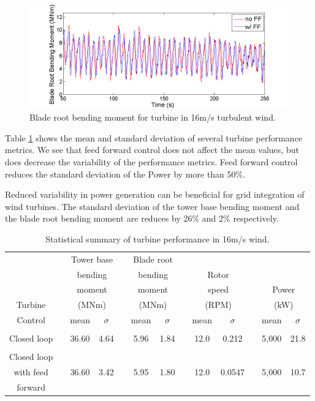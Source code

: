 \begin{figure}[htbp]
	\centering
		\includegraphics[trim = {1cm 0 2cm 0}, clip, width = \linewidth]{Figures/ch3Figures/fig3-23.png}
		
	\caption{Blade root bending moment for turbine in 16m/s turbulent wind.}
	\label{fig3-23}
\end{figure}

Table \ref{Table3-2} shows the mean and standard deviation of several turbine performance metrics. We see that feed forward control does not affect the mean values, but does decrease the variability of the performance metrics. Feed forward control reduces the standard deviation of the Power by more than 50$\%$. 

Reduced variability in power generation can be beneficial for grid integration of wind turbines. The standard deviation of the tower base bending moment and the blade root bending moment are reduces by 26$\%$ and 2$\%$ respectively. 

\begin{table}
\centering
\begin{tabular}{ c | c c c c c c c c c c c c}
\hline
\hline
	& & \multicolumn{2}{c}{Tower base}	& & \multicolumn{2}{c}{Blade root}		& & \\
	& & \multicolumn{2}{c}{bending}	& & \multicolumn{2}{c}{bending}		& &\multicolumn{2}{c}{Rotor}	& & \\
	& & \multicolumn{2}{c}{moment}	& & \multicolumn{2}{c}{moment}		& &\multicolumn{2}{c}{speed}		& &\multicolumn{2}{c}{Power} \\	
Turbine					& & \multicolumn{2}{c}{(MNm)}  					& & \multicolumn{2}{c}{(MNm)}	& & \multicolumn{2}{c}{(RPM)}	& & \multicolumn{2}{c}{(kW)}\\
\cline{3-4} \cline{6-7} \cline{9-10} \cline{12-13} 
Control & & mean & $\sigma$ & & mean & $\sigma$ & & mean & $\sigma$  & & mean & $\sigma$ \\
\hline
\\
Closed loop & & 36.60 & 4.64  & & 5.96 & 1.84  && 12.0 & 0.212&& 5,000  & 21.8 \\
 \\
Closed loop \\
with feed   & & 36.60 & 3.42  & & 5.95 & 1.80 && 12.0 & 0.0547  && 5,000  & 10.7 \\
forward\\
\hline
\hline
\end{tabular}
\caption{Statistical summary of turbine performance in 16m/s wind.}
\label{Table3-2}
\end{table}


